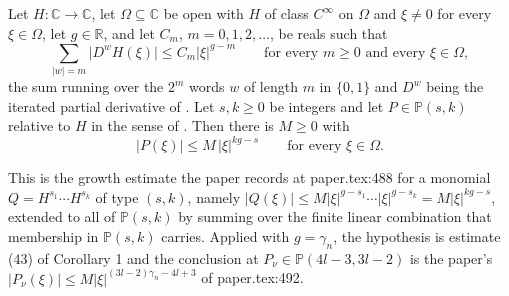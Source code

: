\begin{lemma}
Let $H\colon\mathbb{C}\to\mathbb{C}$, let $\Omega\subseteq\mathbb{C}$ be open
with $H$ of class $C^\infty$ on $\Omega$ and $\xi\neq0$ for every
$\xi\in\Omega$, let $g\in\mathbb{R}$, and let $C_m$, $m=0,1,2,\dots$, be reals
such that
\[
  \sum_{|w|=m}\bigl|D^{w}H(\xi)\bigr|\le C_m|\xi|^{g-m}
  \qquad\text{for every }m\ge0\text{ and every }\xi\in\Omega,
\]
the sum running over the $2^m$ words $w$ of length $m$ in $\{0,1\}$ and $D^{w}$
being the iterated partial derivative of .  Let
$s,k\ge0$ be integers and let $P\in\mathbb{P}(s,k)$ relative to $H$ in the
sense of .  Then there is $M\ge0$ with
\[
  \bigl|P(\xi)\bigr|\le M\,|\xi|^{kg-s}\qquad\text{for every }\xi\in\Omega .
\]

This is the growth estimate the paper records at paper.tex:488 for a monomial
$Q=H^{s_1}\cdots H^{s_k}$ of type $(s,k)$, namely
$|Q(\xi)|\le M|\xi|^{g-s_1}\cdots|\xi|^{g-s_k}=M|\xi|^{kg-s}$, extended to all
of $\mathbb{P}(s,k)$ by summing over the finite linear combination that
membership in $\mathbb{P}(s,k)$ carries.  Applied with $g=\gamma_n$, the
hypothesis is estimate (43) of Corollary 1 and the conclusion at
$P_\nu\in\mathbb{P}(4l-3,3l-2)$ is the paper's
$|P_\nu(\xi)|\le M|\xi|^{(3l-2)\gamma_n-4l+3}$ of paper.tex:492.
\end{lemma}
